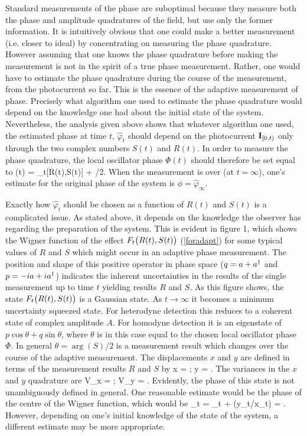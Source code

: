 Standard measurements of the phase are suboptimal because they measure both
the phase and amplitude quadratures of the field, but use only the former
information. It is intuitively obvious that one could make a better measurement 
(i.e. closer to ideal) by concentrating on measuring the phase quadrature.
However assuming that one knows the phase quadrature before making the
measurement is not in the spirit of a true phase measurement. Rather, one would
have to estimate the phase quadrature during the course of the measurement, from
the photocurrent so far. This is the essence of the adaptive measurement of
phase. Precisely what algorithm one used to estimate the phase quadrature would
depend on the knowledge one had about the initial state of the system.
Nevertheless, the analysis given above shows that whatever algorithm one used,
the estimated phase at time $t$, $\hat\varphi_t$ should depend on the
photocurrent ${\bf I}_{[0,t)}$ only through the two complex numbers $S(t)$ and $R(t)$. In
order to measure the phase quadrature, the local oscillator phase $\Phi(t)$ should
therefore be set equal to 
\beq \label{ctrl}
\Phi(t) = \hat\varphi_t[R(t),S(t)] + \pi/2.
\eeq
When the measurement is over (at $t=\infty$), one's estimate for the original phase of the
system is $\phi=\hat\varphi_\infty$. 

Exactly how $\hat\varphi_t$ should be chosen as a function of $R(t)$ and $S(t)$
is a complicated issue. As stated above, it depends on the knowledge the observer
has regarding the preparation of the system. This is evident in figure 1, which 
shows the  Wigner function of the effect
 $F_t{\bigl(} R(t),S(t){\bigr)}$ (\ref{foradapt}) for some typical
values of $R$ and $S$ which might occur in an adaptive phase measurement. The
position and shape of this positive operator in phase space ($q=a+a^\dagger$ and $p =
-ia+ia^\dagger$) indicates the inherent uncertainties in the results of the single
measurement up to time $t$ yielding results $R$ and $S$. As this figure shows, the
state $F_t{\bigl(} R(t),S(t){\bigr)}$ is a Gaussian state. As $t\to\infty$ it becomes a
minimum uncertainty squeezed state. For heterodyne detection this reduces to a
coherent state of complex amplitude $A$. For homodyne detection it is an
eigenstate of $p\cos\theta+q\sin\theta$, where $\theta$ is in this case
equal to the chosen local oscillator phase $\Phi$. In general $\theta=\arg(S)/2$
is a measurement result which changes over the course of the adaptive measurement.
The displacements $x$ and $y$ are defined in terms of the
measurement results $R$ and $S$ by  \beq x =  \;;\;\;  y = . \label{defxy} \eeq  The variances in the $x$ and $y$
quadrature are \beq V_x =  \;;\;\;
 V_y = . \label{defvxvy} \eeq 
 Evidently, the phase of this state is not unambiguously defined in general. One
reasonable estimate would be the phase of the centre of the Wigner function, which
would be  \beq
\hat\varphi_t = \theta_t + \arctan(y_t/x_t) = \arg \left[ R(1-e^{-t}) + S R^* \right].
\eeq
However, depending on one's initial knowledge of the state of the
system, a different estimate may be more appropriate. 

